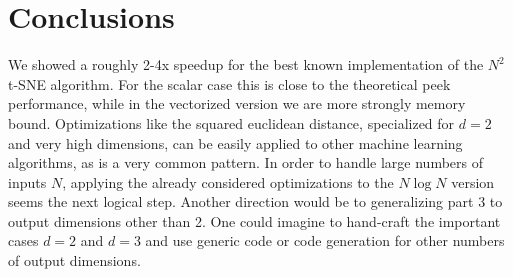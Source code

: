 \documentclass[letterpaper]{article}
\begin{document}
\section{Conclusions}

We showed a roughly 2-4x speedup for the best known implementation of the $N^2$ t-SNE algorithm. For the scalar case this is close to the theoretical peek performance, while in the vectorized version we are more strongly memory bound. Optimizations like the squared euclidean distance, specialized for $d=2$ and very high dimensions, can be easily applied to other machine learning algorithms, as is a very common pattern. In order to handle large numbers of inputs $N$, applying the already considered optimizations to the $N \log N$ version seems the next logical step. Another direction would be to generalizing part 3 to output dimensions other than 2. One could imagine to hand-craft the important cases $d=2$ and $d=3$ and use generic code or code generation for other numbers of output dimensions.




\end{document}
